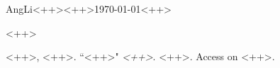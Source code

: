 \documentclass[12pt,letterpaper]{article}
\begin{document}
\begin{mla}{Ang}{Li}{<++>}{<++>}{\today}{<++>}

    <++>

\begin{workscited}
\bibent
    <++>, <++>.  ``<++>"  \textit{<++>}. <++>. Access on <++>.
\end{workscited}

\end{mla}
\end{document}

